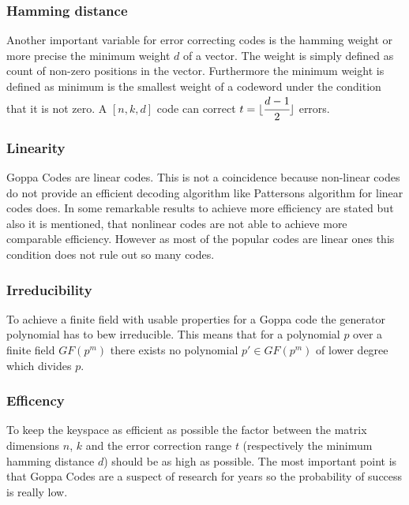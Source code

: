 
\subsubsection*{Hamming distance} Another important variable for error correcting codes is the hamming weight or more precise the minimum weight $d$ of a vector. The weight is simply defined as count of non-zero positions in the vector. Furthermore the minimum weight is defined as minimum is the smallest weight of a codeword under the condition that it is not zero. 
A $[n, k, d]$ code can correct $t =  \lfloor \cfrac{d - 1}{2}\rfloor$ errors. 


\subsubsection*{Linearity}
Goppa Codes are linear codes. This is not a coincidence because non-linear codes do not provide an efficient decoding algorithm like Pattersons algorithm for linear codes does\cite{patterson1975algebraic}. In \cite{zeng2014nonlinear} some remarkable results to achieve more efficiency are stated but also it is mentioned, that nonlinear codes are not able to achieve more comparable efficiency. 
However  as most of the popular codes are linear ones this condition does not rule out so many codes.

\subsubsection*{Irreducibility} 
To achieve a finite field with usable properties for a Goppa code the generator polynomial has to bew irreducible. This means that for a polynomial $p$ over a finite field $GF(p^m)$ there exists no polynomial $p' \in GF(p^m)$ of lower degree which divides $p$.
 

\subsubsection*{Efficency} To keep the keyspace as efficient as possible the factor between the matrix dimensions $n$, $k$ and the error correction range $t$ (respectively the minimum hamming distance $d$) should be as high as possible. The most important point is that Goppa Codes are a suspect of research for years so the probability of success is really low. 

